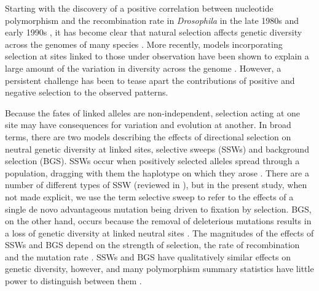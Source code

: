 	Starting with the discovery of a positive correlation between nucleotide polymorphism and the recombination rate in \textit{Drosophila} in the late 1980s and early 1990s \citep{RN225, RN114}, it has become clear that natural selection affects genetic diversity across the genomes of many species \citep{RN117, RN154}. More recently, models incorporating selection at sites linked to those under observation have been shown to explain a large amount of the variation in diversity across the genome \citep{RN120, RN228, RN116, RN274}. However, a persistent challenge has been to tease apart the contributions of positive and negative selection to the observed patterns.

	Because the fates of linked alleles are non-independent, selection acting at one site may have consequences for variation and evolution at another. In broad terms, there are two models describing the effects of directional selection on neutral genetic diversity at linked sites, selective sweeps (SSWs) and background selection (BGS). SSWs occur when positively selected alleles spread through a population, dragging with them the haplotype on which they arose \citep{RN124,RN235}. There are a number of different types of SSW (reviewed in \citealt{RN352}), but in the present study, when not made explicit, we use the term selective sweep to refer to the effects of a single de novo advantageous mutation being driven to fixation by selection. BGS, on the other hand, occurs because the removal of deleterious mutations results in a loss of genetic diversity at linked neutral sites \citep{RN132, RN115}. The magnitudes of the effects of SSWs and BGS depend on the strength of selection, the rate of recombination and the mutation rate \citep{RN206, RN157, RN235}. SSWs and BGS have qualitatively similar effects on genetic diversity, however, and many polymorphism summary statistics have little power to distinguish between them \cite{RN339, RN115}. 

